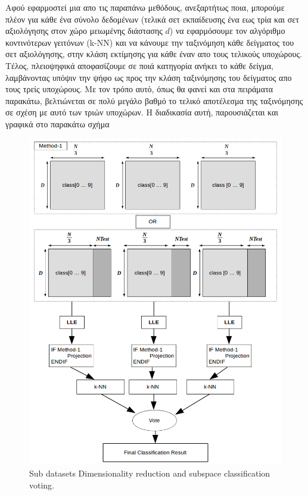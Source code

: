 \par
Αφού εφαρμοστεί μια απο τις παραπάνω μεθόδους, ανεξαρτήτως ποια, μπορούμε πλέον για κάθε ένα σύνολο δεδομένων (τελικά σετ εκπαίδευσης ένα εως τρία και σετ αξιολόγησης στον χώρο μειωμένης διάστασης $d$) να εφαρμόσουμε τον αλγόριθμο κοντινότερων γειτόνων \textlatin{(k-NN)} και να κάνουμε την ταξινόμηση κάθε δείγματος του σετ αξιολόγησης, στην κλάση εκτίμησης για κάθε έναν απο τους τελικούς υποχώρους. Τέλος, πλειοψηφικά αποφασίζουμε σε ποιά κατηγορία ανήκει το κάθε δείγμα, λαμβάνοντας υπόψιν την ψήφο ως προς την κλάση ταξινόμησης του δείγματος απο τους τρείς υποχώρους. Με τον τρόπο αυτό, όπως θα φανεί και στα πειράματα παρακάτω, βελτιώνεται σε πολύ μεγάλο βαθμό το τελικό αποτέλεσμα της ταξινόμησης σε σχέση με αυτό των τριών υποχώρων. Η διαδικασία αυτή, παρουσιάζεται και γραφικά στο παρακάτω σχήμα
\newpage
\begin{figure}[t!]
\centering
\includegraphics[scale=0.8]{figs/7.png}
\newline
\caption{ \textlatin{Sub datasets Dimensionality reduction and subspace classification voting}.} 
\end{figure}
\newpage

